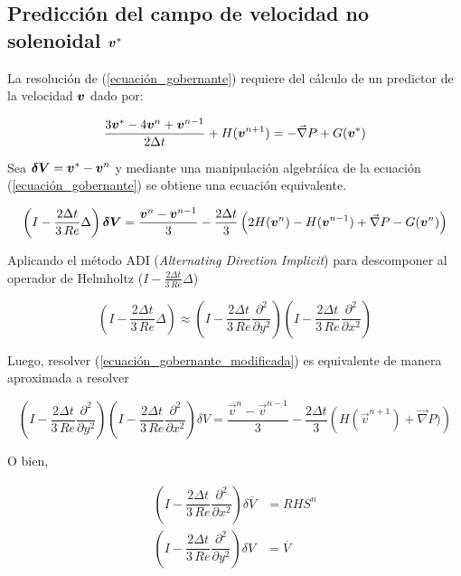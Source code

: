 \subsection{Predicción del campo de velocidad no solenoidal $\boldsymbol{v}^*$}

La resolución de (\ref{ecuación_gobernante}) requiere del cálculo de un predictor de la velocidad $\boldsymbol{v}$ dado por:

\begin{equation}
\dfrac{3 \boldsymbol{v}^{*} -4\boldsymbol{v}^n + \boldsymbol{v}^{n-1}}{2 \Delta t} + H(\boldsymbol{v}^{n+1}) = -\vec{\nabla} P + G(\boldsymbol{v}^{*})
\end{equation}

Sea $\boldsymbol{\delta V} = \boldsymbol{v}^* - \boldsymbol{v}^n $ y mediante una manipulación algebráica de la ecuación (\ref{ecuación_gobernante}) se obtiene una ecuación equivalente.

\begin{equation} \label{ecuación_gobernante_modificada}
\left( I - \dfrac{2 \Delta t}{3 \, Re} \Delta \right) \boldsymbol{\delta V} = \dfrac{\boldsymbol{v}^n-\boldsymbol{v}^{n-1}}{3} - \dfrac{2 \Delta t}{3} \left( 2 H(\boldsymbol{v}^n) - H(\boldsymbol{v}^{n-1}) + \vec{\nabla} P - G(\boldsymbol{v}^n) \right)
\end{equation} 

Aplicando el método ADI (\textit{Alternating Direction Implicit}) para descomponer al operador de Helmholtz ($I - \frac{2 \Delta t}{3 \, Re} \Delta $)

\begin{equation}
\left( I - \dfrac{2 \Delta t}{3 \, Re} \Delta \right) \approx \left( I - \dfrac{2 \Delta t}{3 \, Re} \dfrac{\partial^2}{\partial y^2} \right) \left( I - \dfrac{2 \Delta t}{3 \, Re} \dfrac{\partial^2}{\partial x^2} \right)
\end{equation}

Luego, resolver (\ref{ecuación_gobernante_modificada}) es equivalente de manera aproximada a resolver

\begin{equation}
\left( I - \dfrac{2 \Delta t}{3 \, Re} \dfrac{\partial^2}{\partial y^2} \right)  \left( I - \dfrac{2 \Delta t}{3 \, Re} \dfrac{\partial^2}{\partial x^2} \right) \delta V =  \dfrac{\vec{v}^n-\vec{v}^{n-1}}{3} - \dfrac{2 \Delta t}{3} \left( H(\vec{v}^{n+1}) + \vec{\nabla} P) \right)
\end{equation}

O bien,

\begin{align}
\left( I - \dfrac{2 \Delta t}{3 \, Re} \dfrac{\partial^2}{\partial x^2} \right) \delta \overline{V} &= RHS^n \label{primer_paso} \\ 
\left( I - \dfrac{2 \Delta t}{3 \, Re} \dfrac{\partial^2}{\partial y^2} \right) \delta V &= \overline{V} 
\end{align}

